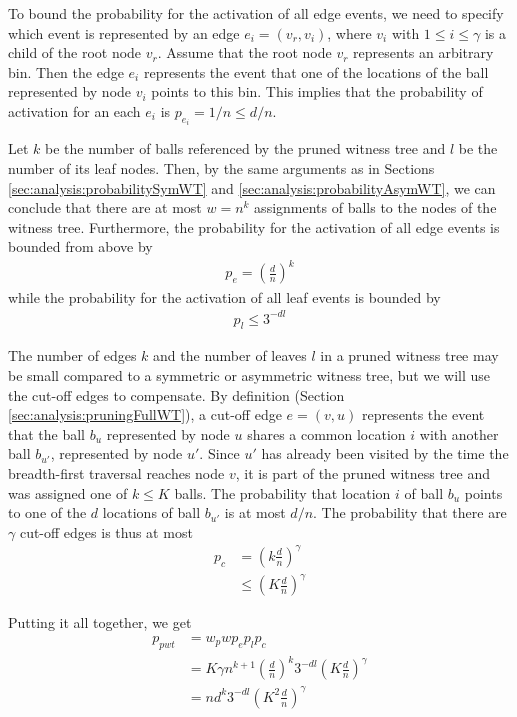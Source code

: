 \documentclass[a4paper,12pt]{article}
\begin{document}
To bound the probability for the activation of all edge events, we need to specify which event is represented by an edge $e_i = (v_r, v_i)$, where $v_i$ with $1 \leq i \leq \gamma$ is a child of the root node $v_r$. Assume that the root node $v_r$ represents an arbitrary bin. Then the edge $e_i$ represents the event that one of the locations of the ball represented by node $v_i$ points to this bin. This implies that the probability of activation for an each $e_i$ is $p_{e_i} = 1/n \leq d/n$. 

Let $k$ be the number of balls referenced by the pruned witness tree and $l$ be the number of its leaf nodes. Then, by the same arguments as in Sections \ref{sec:analysis:probabilitySymWT} and \ref{sec:analysis:probabilityAsymWT}, we can conclude that there are at most $w=n^k$ assignments of balls to the nodes of the witness tree. Furthermore, the probability for the activation of all edge events is bounded from above by 
\begin{align*}
p_e = \left(\frac{d}{n}\right)^{k}
\end{align*}
while the probability for the activation of all leaf events is bounded by 
\begin{align*}
p_l \leq 3^{-d l}
\end{align*} 

The number of edges $k$ and the number of leaves $l$ in a pruned witness tree may be small compared to a symmetric or asymmetric witness tree, but we will use the cut-off edges to compensate. By definition (Section \ref{sec:analysis:pruningFullWT}), a cut-off edge $e=(v, u)$ represents the event that the ball $b_u$ represented by node $u$ shares a common location $i$ with another ball $b_{u'}$, represented by node $u'$. Since $u'$ has already been visited by the time the breadth-first traversal reaches node $v$, it is part of the pruned witness tree and was assigned one of $k\leq K$ balls. The probability that location $i$ of ball $b_u$ points to one of the $d$ locations of ball $b_{u'}$ is at most $d/n$. The probability that there are $\gamma$ cut-off edges is thus at most 
\begin{align*}
p_c &= \left(k \frac{d}{n}\right)^\gamma \\
    & \leq \left(K \frac{d}{n}\right)^\gamma
\end{align*}

Putting it all together, we get 
\begin{align*}
p_{pwt} &= w_p w  p_e  p_l  p_c \\
		&= K\gamma n^{k+1} \left(\frac{d}{n}\right)^k3^{-d l}  \left(K \frac{d}{n}\right)^\gamma\\
		&= n  d^k 3^{-d l}  \left(K^2 \frac{d}{n} \right)^\gamma 
\end{align*}
\end{document}
